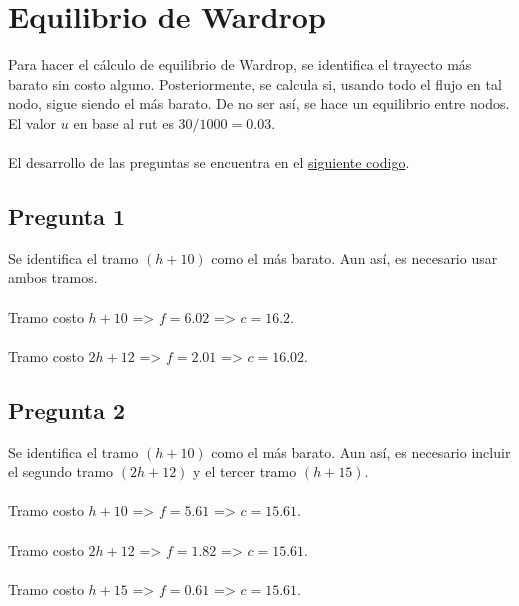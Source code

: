 \documentclass{article}  %
\begin{document}
\newpage
\thispagestyle{empty} %

\newpage
\setcounter{page}{1}
\section{Equilibrio de Wardrop}

Para hacer el cálculo de equilibrio de Wardrop, se identifica el trayecto más barato sin costo alguno. Posteriormente, se calcula si, usando todo el flujo en tal nodo, sigue siendo el más barato. De no ser así, se hace un equilibrio entre nodos. El valor \( u \) en base al rut es \( 30/1000 = 0.03 \).
\\ \\
El desarrollo de las preguntas se encuentra en el \href{https://github.com/LukasWolff2002/TAREA_5_AUTITOS/blob/main/CODIGO/codigo_final.py}{siguiente codigo}.

\subsection{Pregunta 1}

Se identifica el tramo \( (h + 10) \) como el más barato. Aun así, es necesario usar ambos tramos.
\\ \\
Tramo costo \( h + 10 \) => \( f = 6.02 \) => \( c = 16.2 \).
\\ \\
Tramo costo \( 2h + 12 \) => \( f = 2.01 \) => \( c = 16.02 \).

\subsection{Pregunta 2}

Se identifica el tramo \( (h+10) \) como el más barato. Aun así, es necesario incluir el segundo tramo \( (2h+12) \) y el tercer tramo \( (h+15) \).
\\ \\
Tramo costo \( h + 10 \) => \( f = 5.61 \) => \( c = 15.61 \).
\\ \\
Tramo costo \( 2h + 12 \) => \( f = 1.82 \) => \( c = 15.61 \).
\\ \\
Tramo costo \( h + 15 \) => \( f = 0.61 \) => \( c = 15.61 \).
\end{document}
